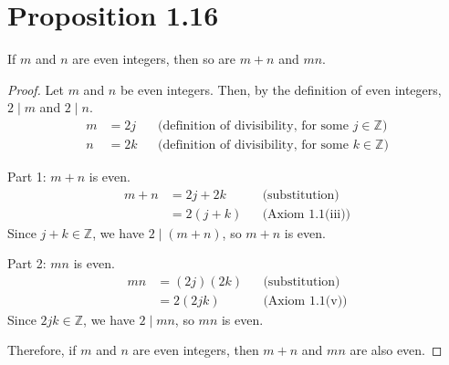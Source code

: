 \section*{Proposition 1.16}
If $m$ and $n$ are even integers, then so are $m+n$ and $mn$.
\begin{proof}
    Let $m$ and $n$ be even integers. Then, by the definition of even integers, $2 \mid m$ and $2 \mid n$.
    \begin{align*}
        m & = 2j &  & \text{(definition of divisibility, for some $j \in \mathbb{Z}$)} \\
        n & = 2k &  & \text{(definition of divisibility, for some $k \in \mathbb{Z}$)}
    \end{align*}

    Part 1: $m + n$ is even.
    \begin{align*}
        m + n & = 2j + 2k  &  & \text{(substitution)}   \\
              & = 2(j + k) &  & \text{(Axiom 1.1(iii))}
    \end{align*}
    Since $j + k \in \mathbb{Z}$, we have $2 \mid (m + n)$, so $m + n$ is even.

    Part 2: $mn$ is even.
    \begin{align*}
        mn & = (2j)(2k) &  & \text{(substitution)} \\
           & = 2(2jk)   &  & \text{(Axiom 1.1(v))}
    \end{align*}
    Since $2jk \in \mathbb{Z}$, we have $2 \mid mn$, so $mn$ is even.

    Therefore, if $m$ and $n$ are even integers, then $m + n$ and $mn$ are also even.
\end{proof}

